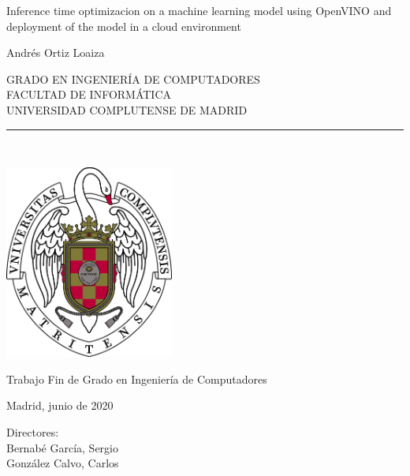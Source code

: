 \newpage


\thispagestyle{empty}


\begin{center}

    \vspace{1cm}


    {\Large Inference time optimizacion on a machine learning model using OpenVINO and deployment of the model in a cloud environment}\\

    \vspace{1.5cm}

    {\large Andrés Ortiz Loaiza}\\

    \vspace{1.5cm}

    GRADO EN INGENIERÍA DE COMPUTADORES\\ FACULTAD DE INFORMÁTICA\\
    UNIVERSIDAD COMPLUTENSE DE MADRID \\


    \vspace{0.65cm}
    \rule{2in}{0.5pt}\\
    \vspace{0.85cm}

    \includegraphics[height=2.5in]{images/ucm/shield2.jpg}

    \vspace{0.5cm}
    Trabajo Fin de Grado en Ingeniería de Computadores

    \vspace{0.5cm}

   Madrid, junio de 2020\\
    \vspace{3cm}

\end{center}

{\raggedleft
    Directores:\\
    \vspace{ 0.5cm}
    Bernabé García, Sergio\\
    González Calvo, Carlos\\
}